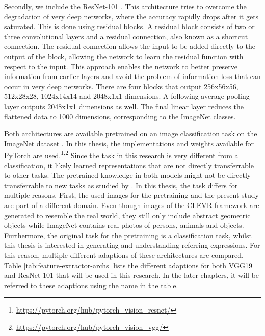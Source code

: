 Secondly, we include the ResNet-101 \citep{He2016}.
This architecture tries to overcome the degradation of very deep networks, where the accuracy rapidly drops after it gets saturated.
This is done using residual blocks.
A residual block consists of two or three convolutional layers and a residual connection, also known as a shortcut connection.
The residual connection allows the input to be added directly to the output of the block, allowing the network to learn the residual function with respect to the input.
This approach enables the network to better preserve information from earlier layers and avoid the problem of information loss that can occur in very deep networks.
There are four blocks that output 256x56x56, 512x28x28, 1024x14x14 and 2048x1x1 dimensions.
A following average pooling layer outputs 2048x1x1 dimensions as well.
The final linear layer reduces the flattened data to 1000 dimensions, corresponding to the ImageNet classes.

Both architectures are available pretrained on an image classification task on the ImageNet dataset \citep{Deng2009}.
In this thesis, the implementations and weights available for PyTorch are used.\footnote{\href{https://pytorch.org/hub/pytorch\_vision\_resnet/}{https://pytorch.org/hub/pytorch\_vision\_resnet/}}\textsuperscript{,}\footnote{\href{https://pytorch.org/hub/pytorch\_vision\_vgg/}{https://pytorch.org/hub/pytorch\_vision\_vgg/}}
Since the task in this research is very different from a classification, it likely learned representations that are not directly transferrable to other tasks.
The pretrained knowledge in both models might not be directly transferrable to new tasks as studied by \citet{Yosinski2014}.
In this thesis, the task differs for multiple reasons.
First, the used images for the pretraining and the present study are part of a different domain.
Even though images of the CLEVR framework are generated to resemble the real world, they still only include abstract geometric objects while ImageNet contains real photos of persons, animals and objects.
Furthermore, the original task for the pretraining is a classification task, whilst this thesis is interested in generating and understanding referring expressions.
For this reason, multiple different adaptions of these architectures are compared.
Table \ref{tab:feature-extractor-archs} lists the different adaptions for both VGG19 and ResNet-101 that will be used in this research.
In the later chapters, it will be referred to these adaptions using the name in the table.

